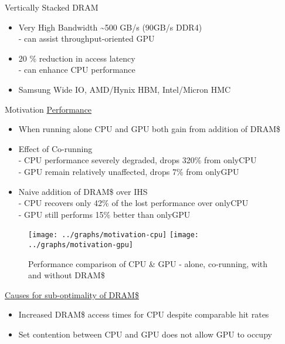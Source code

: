\documentclass[final,t]{beamer}
\begin{document}
\begin{frame}[t,fragile]{}
\begin{columns}[t]
\begin{column}{.47\linewidth}
\begin{exampleblock}{Vertically Stacked DRAM}
\begin{itemize}
    		\item Very High Bandwidth \textasciitilde 500 GB/s (90GB/s DDR4)\\
    				\qquad - can assist throughput-oriented GPU
    		\item 20 \% reduction in access latency \\
    				\qquad - can enhance CPU performance
        	\item Samsung Wide IO, AMD/Hynix HBM, Intel/Micron HMC
        \end{itemize}
    \end{exampleblock}
    \begin{exampleblock}{Motivation}
    \centering 
    \underline{Performance}

    \begin{itemize}
       	\item When running alone CPU and GPU both gain from addition of DRAM\$
      	\item Effect of Co-running \\
      		\qquad - CPU performance severely degraded, drops 320\% from onlyCPU\\
      		\qquad - GPU remain relatively unaffected, drops 7\% from onlyGPU
      	\item Naive addition of DRAM\$ over IHS \\
      		\qquad - CPU recovers only 42\% of the lost performance over onlyCPU \\
      		\qquad - GPU still performs  15\% better than onlyGPU \\
    \end{itemize}
    \begin{figure}
       \texttt{[image: ../graphs/motivation-cpu]}
       \texttt{[image: ../graphs/motivation-gpu]}
       \caption{Performance comparison of CPU \& GPU - alone, co-running, with and without DRAM\$}
       \label{fig:motivation}
    \end{figure}
    
    \underline{Causes for sub-optimality of DRAM\$}
    \begin{itemize}
   		\item Increased DRAM\$ access times for CPU despite comparable hit rates
        \item Set contention between CPU and GPU does not allow GPU to occupy 
    \end{itemize}
    

\end{exampleblock}
\end{column}
\end{columns}
\end{frame}
\end{document}
